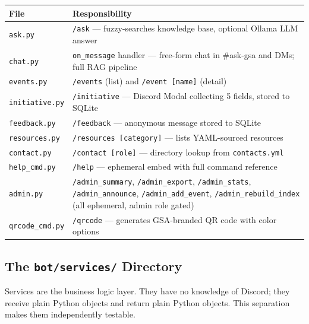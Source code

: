 \documentclass[12pt,letterpaper]{article}
\begin{document}
\begin{center}
\begin{longtable}{lp{9cm}}
\toprule
\textbf{File} & \textbf{Responsibility} \\
\midrule
\texttt{ask.py} & \texttt{/ask} — fuzzy-searches knowledge base, optional Ollama LLM answer \\
\texttt{chat.py} & \texttt{on\_message} handler — free-form chat in \#ask-gsa and DMs; full RAG pipeline \\
\texttt{events.py} & \texttt{/events} (list) and \texttt{/event [name]} (detail) \\
\texttt{initiative.py} & \texttt{/initiative} — Discord Modal collecting 5 fields, stored to SQLite \\
\texttt{feedback.py} & \texttt{/feedback} — anonymous message stored to SQLite \\
\texttt{resources.py} & \texttt{/resources [category]} — lists YAML-sourced resources \\
\texttt{contact.py} & \texttt{/contact [role]} — directory lookup from \texttt{contacts.yml} \\
\texttt{help\_cmd.py} & \texttt{/help} — ephemeral embed with full command reference \\
\texttt{admin.py} & \texttt{/admin\_summary}, \texttt{/admin\_export}, \texttt{/admin\_stats}, \texttt{/admin\_announce}, \texttt{/admin\_add\_event}, \texttt{/admin\_rebuild\_index} (all ephemeral, admin role gated) \\
\texttt{qrcode\_cmd.py} & \texttt{/qrcode} — generates GSA-branded QR code with color options \\
\bottomrule
\end{longtable}
\end{center}

\subsection{The \texttt{bot/services/} Directory}

Services are the business logic layer. They have no knowledge of Discord; they
receive plain Python objects and return plain Python objects. This separation
makes them independently testable.
\end{document}
